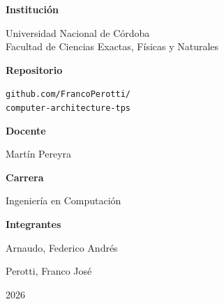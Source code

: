 \begin{titlepage}
  \begin{minipage}[t]{0.45\textwidth}
    \raggedright
    {\color{technicalviolet}\bfseries Institución\par}
    \vspace{0.18cm}
    Universidad Nacional de Córdoba\\
    Facultad de Ciencias Exactas, Físicas y Naturales\\[0.55cm]
    {\color{technicalviolet}\bfseries Repositorio\par}
    \vspace{0.18cm}
    \small\texttt{github.com/FrancoPerotti/}\\
    \texttt{computer-architecture-tps}
  \end{minipage}
  \hfill
  \begin{minipage}[t]{0.43\textwidth}
    \raggedright
    {\color{technicalviolet}\bfseries Docente\par}
    \vspace{0.18cm}
    Martín Pereyra\\[0.55cm]
    {\color{technicalviolet}\bfseries Carrera\par}
    \vspace{0.18cm}
    Ingeniería en Computación
  \end{minipage}

  \vspace{0.8cm}

  \begin{minipage}{0.92\textwidth}
    {\color{technicalviolet}\bfseries Integrantes\par}
    \vspace{0.2cm}
    \small
    \begin{minipage}[t]{0.46\linewidth}
      \raggedright Arnaudo, Federico Andrés
    \end{minipage}
    \hfill
    \begin{minipage}[t]{0.46\linewidth}
      \raggedright Perotti, Franco José
    \end{minipage}
  \end{minipage}

  \vspace{0.55cm}
  {\Large 2026\par}
\end{titlepage}
